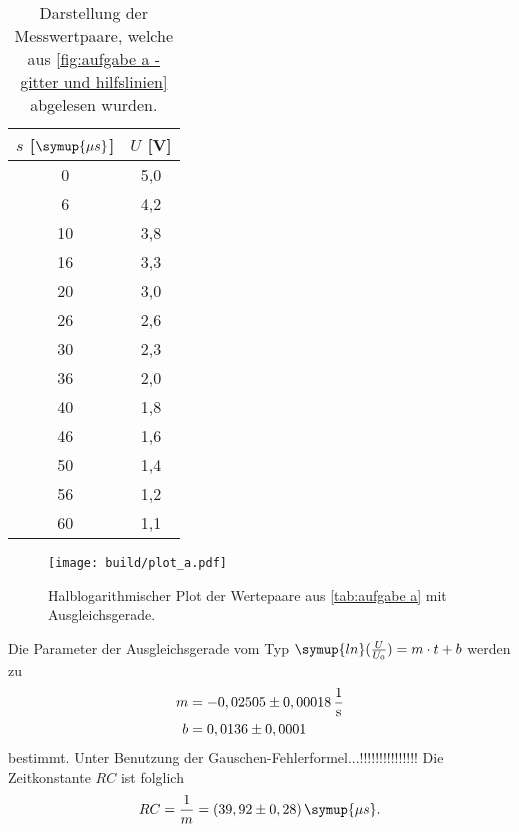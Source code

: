 \begin{table}
  \centering
  \caption{Darstellung der Messwertpaare, welche aus \autoref{fig:aufgabe a - gitter und hilfslinien} abgelesen wurden.}
  \label{tab:aufgabe a}
  \begin{tabular}{S[table-format=2.0] S[table-format=1.1]}
    \toprule
    {$s$ [$\symup{\mu s}$]} & {$U$ [V]} \\
     &  5,0 \\
    6	&  4,2 \\
    10 & 3,8 \\
    16 & 3,3 \\
    20 & 3,0 \\
    26 & 2,6 \\
    30 & 2,3 \\
    36 & 2,0 \\
    40 & 1,8 \\
    46 & 1,6 \\
    50 & 1,4 \\
    56 & 1,2 \\
    60 & 1,1 \\
    \bottomrule
  \end{tabular}
\end{table}

\begin{figure}
  \centering
  \texttt{[image: build/plot\_a.pdf]}
  \caption{Halblogarithmischer Plot der Wertepaare aus \autoref{tab:aufgabe a} %
  mit Ausgleichsgerade.}
  \label{fig:plot_a}
\end{figure}



Die Parameter der
Ausgleichsgerade vom Typ $\symup{ln}(\frac{U}{U_{0}}) = m \cdot t + b$ werden zu 
\begin{align}
  m&=-0,02505\pm0,00018\,\unit{\per\second} \\
  b&=0,0136\pm0,0001 \notag
\end{align} 
bestimmt. Unter Benutzung der Gauschen-Fehlerformel...!!!!!!!!!!!!!!!
Die Zeitkonstante $RC$ ist folglich
\begin{gather}
  RC = \frac{1}{m} = (39,92\pm0,28)\,\symup{\mu s}.
\end{gather}



